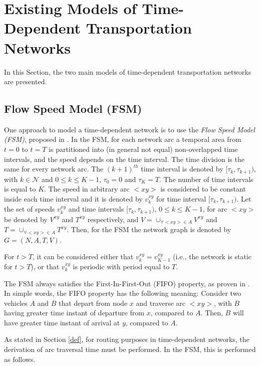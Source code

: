 \documentclass[conference]{IEEEtran}
\begin{document}
\section{Existing Models of Time-Dependent Transportation Networks} \label{models}

In this Section, the two main models of time-dependent transportation networks are presented.


\subsection{Flow Speed Model (FSM)} \label{fsm}

One approach to model a time-dependent network is to use the \emph{Flow Speed Model (FSM)}, proposed in \cite{Sung}. In the FSM, for each network arc a temporal area from $t=0$ to $t=T$ is partitioned into (in general not equal) non-overlapped time intervals, and the speed depends on the time interval. The time division is the same for every network arc. The $(k+1)^{th}$ time interval is denoted by $[\tau_k, \tau_{k+1})$, with  $k \in \mathcal{N}$ and $0\leq k \leq K-1$, $\tau_0=0$ and $\tau_K=T$. The number of time intervals is equal to $K$.  The speed in arbitrary arc $<xy>$ is considered to be constant inside each time interval and it is denoted by $v^{xy}_{k}$ for time interval $[\tau_k, \tau_{k+1})$. Let the set of speeds $v^{xy}_{k}$ and time intervals $[\tau_k, \tau_{k+1})$, $0\leq k \leq K-1$, for arc $<xy>$ be denoted by $V^{xy}$ and $T^{xy}$ respectively, and $V=\cup_{\forall <xy>\in A} V^{xy}$ and $T=\cup_{\forall <xy>\in A} T^{xy}$. Then, for the FSM the network graph is denoted by  $G=(N, A, T, V)$. 

For $t>T$, it can be considered either that $v_k^{xy}=v_{K-1}^{xy}$ (i.e., the network is static for $t>T$), or  that $v_k^{xy}$ is periodic with period equal to $T$.


The FSM always satisfies the First-In-First-Out (FIFO) property, as proven in \cite{Sung}. In simple words, the FIFO property has the following meaning: Consider two vehicles $A$ and $B$ that depart from node $x$ and traverse arc $<xy>$, with $B$ having greater time instant of departure from $x$, compared to $A$. Then, $B$ will have greater time instant of arrival at $y$,  compared to $A$.

As stated in Section \ref{def}, for routing purposes in time-dependent networks, the derivation of arc traversal time must be performed. In the FSM, this is performed as follows. 
\end{document}
